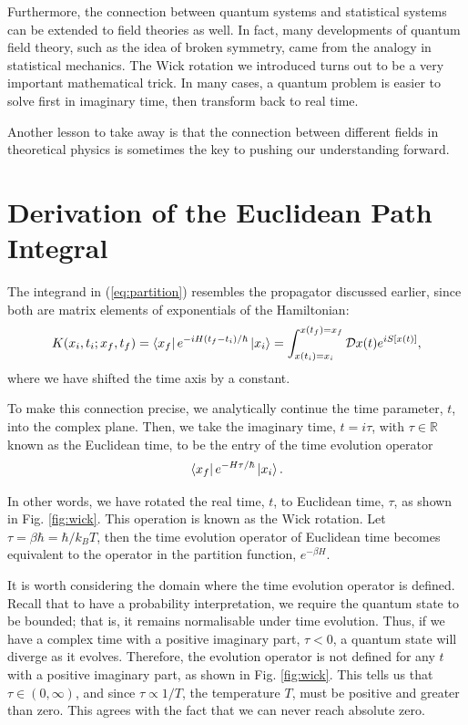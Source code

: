 \documentclass[12pt,a4paper]{article}
\begin{document}
Furthermore, the connection between quantum systems and statistical systems can be extended to field theories as well. In fact, many developments of quantum field theory, such as the idea of broken symmetry, came from the analogy in statistical mechanics. The Wick rotation we introduced turns out to be a very important mathematical trick. In many cases, a quantum problem is easier to solve first in imaginary time, then transform back to real time.

Another lesson to take away is that the connection between different fields in theoretical physics is sometimes the key to pushing our understanding forward.

\newpage
\appendix
\section{Derivation of the Euclidean Path Integral}
\label{app:wick}

The integrand in (\ref{eq:partition}) resembles the propagator discussed earlier, since both are matrix elements of exponentials of the Hamiltonian: 
\begin{equation}
    K(x_i,t_i;x_f,t_f) = \bra{x_f}e^{-iH(t_f-t_i)/\hbar}\ket{x_i} = \int_{x(t_i)=x_i}^{x(t_f)=x_f} \mathcal{D}x(t)e^{iS[x(t)]},
\end{equation}
where we have shifted the time axis by a constant.

To make this connection precise, we analytically continue the time parameter, $t$, into the complex plane. Then, we take the imaginary time, $t=i\tau$, with $\tau\in\mathbb{R}$ known as the Euclidean time, to be the entry of the time evolution operator
\begin{equation}
    \bra{x_f}e^{-H\tau/\hbar}\ket{x_i}.
\end{equation}

In other words, we have rotated the real time, $t$, to Euclidean time, $\tau$, as shown in Fig. \ref{fig:wick}. This operation is known as the Wick rotation.
Let $\tau = \beta\hbar = \hbar/k_BT$, then the time evolution operator of Euclidean time becomes equivalent to the operator in the partition function, $e^{-\beta H}$.


It is worth considering the domain where the time evolution operator is defined. 
Recall that to have a probability interpretation, we require the quantum state to be bounded; that is, it remains normalisable under time evolution.
Thus, if we have a complex time with a positive imaginary part, $\tau<0$, a quantum state will diverge as it evolves. 
Therefore, the evolution operator is not defined for any $t$ with a positive imaginary part, as shown in Fig. \ref{fig:wick}. 
This tells us that $\tau \in (0,\infty)$, and since $\tau \propto 1/T$, the temperature $T$, must be positive and greater than zero.
This agrees with the fact that we can never reach absolute zero.
\end{document}
